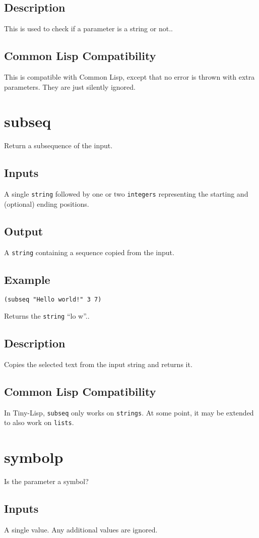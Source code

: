 \documentclass[10pt, openany]{book}
\newcommand{\keyword}[1]{\texttt{#1}}
\newcommand{\datatype}[1]{\texttt{#1}}
\newcommand{\tl}{Tiny-Lisp}
\newcommand{\cl}{Common Lisp}
\begin{document}
\subsection{Description}
This is used to check if a parameter is a string or not..
\subsection{Common Lisp Compatibility}
This is compatible with \cl, except that no error is thrown with extra parameters.  They are just silently ignored.

\section{subseq}
Return a subsequence of the input.
\subsection{Inputs}
A single \datatype{string} followed by one or two \datatype{integers} representing the starting and (optional) ending positions.
\subsection{Output}
A \datatype{string} containing a sequence copied from the input.
\subsection{Example}
\begin{lstlisting}
(subseq "Hello world!" 3 7)
\end{lstlisting}
Returns the \datatype{string} ``lo w''..
\subsection{Description}
Copies the selected text from the input string and returns it.
\subsection{Common Lisp Compatibility}
In \tl, \keyword{subseq} only works on \datatype{strings}.  At some point, it may be extended to also work on \datatype{lists}.

\section{symbolp}
Is the parameter a symbol?
\subsection{Inputs}
A single value.  Any additional values are ignored.
\end{document}
